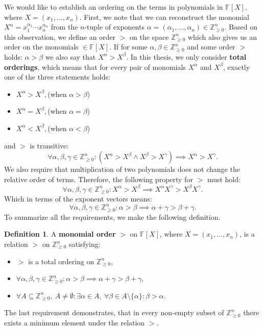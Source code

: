 \documentclass[thesis=M,english]{FITthesis}[2012/10/20]
\theoremstyle{remark}
\theoremstyle{definition}
\newtheorem{DF}{Definition}[section]
\begin{document}
\noindent We would like to establish an ordering on the terms in polynomials in $\mathbb{F}[X],$ where $X = (x_1, \ldots, x_n)$. First, we note that we can reconstruct the monomial $X^{\alpha} = x_1^{\alpha_1}\cdots x_n^{\alpha_n}$ from the $n$-tuple of exponents $\alpha = (\alpha_1,\ldots, \alpha_n) \in \mathbb{Z}_{\geq 0}^n.$ Based on this observation, we define an order $>$ on the space $\mathbb{Z}_{\geq 0}^n$ which also gives us an order on the monomials $\in \mathbb{F}[X].$ If for some $\alpha, \beta \in  \mathbb{Z}_{\geq 0}^n$ and some order $>$ holds: $\alpha > \beta$ we also say that $X^\alpha > X^\beta.$ In this thesis, we only consider \textbf{total orderings}, which means that for every pair of monomials $X^\alpha$ and $X^\beta$, exactly one of the three statements holds:
\begin{itemize}
\item $X^\alpha > X^\beta,$\hfill (when $\alpha > \beta$)
\item $X^\alpha = X^\beta,$\hfill (when $\alpha = \beta$)
\item $X^\alpha < X^\beta,$\hfill (when $\alpha < \beta$)
\end{itemize}
\noindent and $>$ is transitive:
$$
\forall \alpha, \beta, \gamma \in \mathbb{Z}_{\geq 0}^n: (X^\alpha > X^\beta \land X^\beta > X^\gamma) \implies X^\alpha > X^\gamma.
$$
\noindent We also require that multiplication of two polynomials does not change the relative order of terms. Therefore, the following property for $>$ must hold:
$$
\forall \alpha, \beta, \gamma \in \mathbb{Z}_{\geq 0}^n: X^\alpha > X^\beta \implies X^\alpha X^\gamma > X^\beta X^\gamma.
$$
\noindent Which in terms of the exponent vectors means: 
$$
\forall \alpha, \beta, \gamma \in \mathbb{Z}_{\geq 0}^n: \alpha > \beta \implies \alpha + \gamma > \beta + \gamma.
$$
\noindent To summarize all the requirements, we make the following definition.
\begin{DF}
A \textbf{monomial order} $>$ on $\mathbb{F}[X]$, where $X = (x_1, \ldots, x_n)$, is a relation $>$ on $\mathbb{Z}_{\geq 0}^n$ satisfying:
\begin{itemize}
\item $>$ is a total ordering on $\mathbb{Z}_{\geq 0}^n$,
\item $\forall \alpha, \beta, \gamma \in \mathbb{Z}_{\geq 0}^n: \alpha > \beta \implies \alpha + \gamma > \beta + \gamma,$
\item $\forall A \subseteq \mathbb{Z}_{\geq 0}^n,\ A \neq \emptyset: \exists \alpha \in A,\ \forall \beta \in A \setminus \{\alpha \}: \beta > \alpha.$ 
\end{itemize}
\noindent The last requirement demonstrates, that in every non-empty subset of $\mathbb{Z}_{\geq 0}^n$ there exists a minimum element under the relation $>$.
\end{DF}
\end{document}
